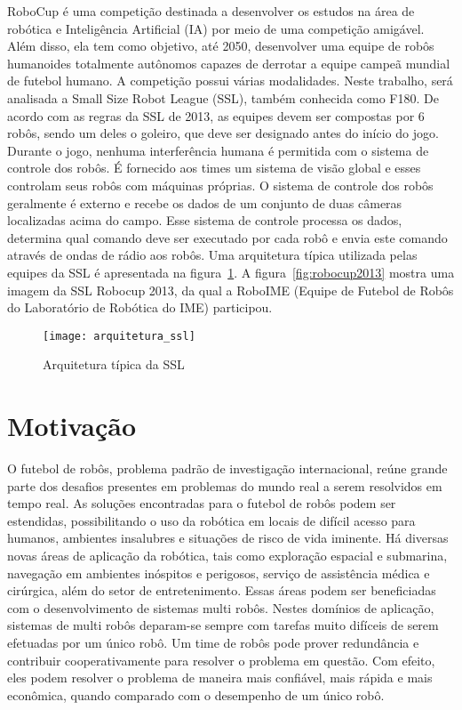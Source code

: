 RoboCup é uma competição destinada a desenvolver os estudos na área de robótica
e Inteligência Artificial (IA) por meio de uma competição amigável. Além disso,
ela tem como objetivo, até 2050, desenvolver uma equipe de robôs humanoides
totalmente autônomos capazes de derrotar a equipe campeã mundial de futebol
humano. A competição possui várias modalidades. Neste trabalho, será analisada a
Small Size Robot League (SSL), também conhecida como F180. De acordo com as
regras da SSL de 2013, as equipes devem ser compostas por 6 robôs, sendo um deles o
goleiro, que deve ser designado antes do início do jogo. Durante o jogo, nenhuma
interferência humana é permitida com o sistema de controle dos robôs. É
fornecido aos times um sistema de visão global e esses controlam seus robôs com
máquinas próprias. O sistema de controle dos robôs geralmente é externo e recebe
os dados de um conjunto de duas câmeras localizadas acima do campo. Esse sistema
de controle processa os dados, determina qual comando deve ser executado por
cada robô e envia este comando através de ondas de rádio aos robôs.
Uma arquitetura típica utilizada pelas equipes da SSL é apresentada na
figura~\ref{fig:arq_ssl}.
A figura~\ref{fig:robocup2013} mostra uma imagem da
SSL Robocup 2013, da qual a RoboIME (Equipe de Futebol de Robôs do Laboratório
de Robótica do IME) participou.

\begin{figure}
  \centering
  \texttt{[image: arquitetura\_ssl]}
  \caption{Arquitetura típica da SSL}\label{fig:arq_ssl}
\end{figure}

\section{Motivação}


O futebol de robôs, problema padrão de investigação internacional, reúne grande
parte dos desafios presentes em problemas do mundo real a serem resolvidos em
tempo real. As soluções encontradas para o futebol de robôs podem ser
estendidas, possibilitando o uso da robótica em locais de difícil acesso para
humanos, ambientes insalubres e situações de risco de vida iminente.  Há
diversas novas áreas de aplicação da robótica, tais como exploração espacial e
submarina, navegação em ambientes inóspitos e perigosos, serviço de assistência
médica e cirúrgica, além do setor de entretenimento. Essas áreas podem ser
beneficiadas com o desenvolvimento de sistemas multi robôs. Nestes domínios de
aplicação, sistemas de multi robôs deparam-se sempre com tarefas muito difíceis
de serem efetuadas por um único robô.  Um time de robôs pode prover redundância
e contribuir cooperativamente para resolver o problema em questão. Com efeito,
eles podem resolver o problema de maneira mais confiável, mais rápida e mais
econômica, quando comparado com o desempenho de um único robô.

